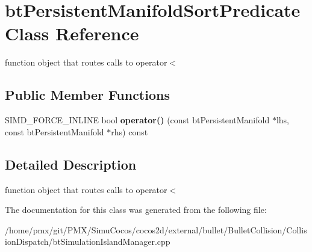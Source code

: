 \hypertarget{classbtPersistentManifoldSortPredicate}{}\section{bt\+Persistent\+Manifold\+Sort\+Predicate Class Reference}
\label{classbtPersistentManifoldSortPredicate}


function object that routes calls to operator$<$  


\subsection*{Public Member Functions}
\begin{DoxyCompactItemize}
\item 
\mbox{\label{classbtPersistentManifoldSortPredicate_ade0b2977472a38c0da5a7b93fd1fa478}} 
S\+I\+M\+D\+\_\+\+F\+O\+R\+C\+E\+\_\+\+I\+N\+L\+I\+NE bool {\bfseries operator()} (const bt\+Persistent\+Manifold $\ast$lhs, const bt\+Persistent\+Manifold $\ast$rhs) const
\end{DoxyCompactItemize}


\subsection{Detailed Description}
function object that routes calls to operator$<$ 

The documentation for this class was generated from the following file\+:\begin{DoxyCompactItemize}
\item 
/home/pmx/git/\+P\+M\+X/\+Simu\+Cocos/cocos2d/external/bullet/\+Bullet\+Collision/\+Collision\+Dispatch/bt\+Simulation\+Island\+Manager.\+cpp\end{DoxyCompactItemize}
